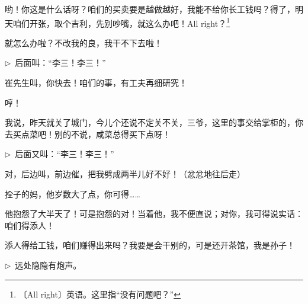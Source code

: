 \documentclass[12pt,UTF-8,openany]{ctexbook}
\begin{document}
\begin{normalsize}
\begin{description}[itemsep=0.5ex,leftmargin=4.5em,labelwidth=4em]
    \item[{\color{script-4-2} 王利发}]哟！你这是什么话呀？咱们的买卖要是越做越好，我能不给你长工钱吗？得了，明天咱们开张，取个吉利，先别吵嘴，就这么办吧！All right？\footnote{〔All right〕英语。这里指“没有问题吧？”}
    
    \item[{\color{script-4-1} 李三}]就怎么办啦？不改我的良，我干不下去啦！
    
    \end{description}
    
    \noindent $\triangleright$~后面叫：“李三！李三！”
    
    \begin{description}[itemsep=0.5ex,leftmargin=4.5em,labelwidth=4em]
    
    \item[{\color{script-4-2} 王利发}]崔先生叫，你快去！咱们的事，有工夫再细研究！
    
    \item[{\color{script-4-1} 李三}]哼！
    
    \item[{\color{script-4-0} 王淑芬}]我说，昨天就关了城门，今儿个还说不定关不关，三爷，这里的事交给掌柜的，你去买点菜吧！别的不说，咸菜总得买下点呀！
    
    \end{description}
    
    \noindent $\triangleright$~后面又叫：“李三！李三！”
    
    \begin{description}[itemsep=0.5ex,leftmargin=4.5em,labelwidth=4em]
    
    \item[{\color{script-4-1} 李三}]对，后边叫，前边催，把我劈成两半儿好不好！（忿忿地往后走）
    
    \item[{\color{script-4-2} 王利发}]拴子的妈，他岁数大了点，你可得……
    
    \item[{\color{script-4-0} 王淑芬}]他抱怨了大半天了！可是抱怨的对！当着他，我不便直说；对你，我可得说实话：咱们得添人！
    
    \item[{\color{script-4-2} 王利发}]添人得给工钱，咱们赚得出来吗？我要是会干别的，可是还开茶馆，我是孙子！
    
    \end{description}
    
    \noindent $\triangleright$~远处隐隐有炮声。
    

\end{normalsize}
\end{document}
